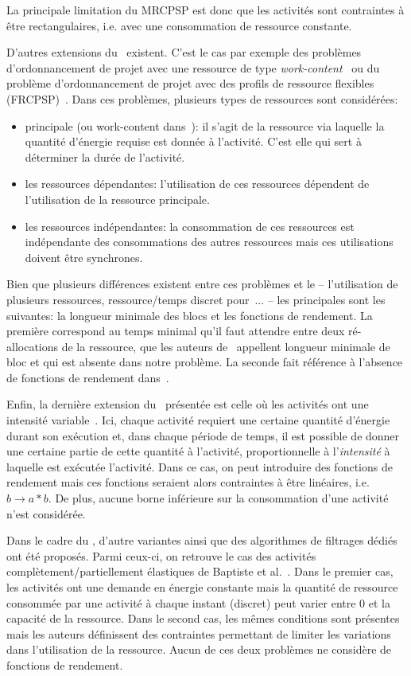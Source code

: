 La principale limitation du MRCPSP est donc que les activités sont
contraintes à être rectangulaires, i.e. avec une consommation de ressource
constante. 

D'autres extensions du \RCPSP~existent. C'est le cas par exemple des
problèmes d'ordonnancement de projet avec une ressource de type {\it
  work-content}~\cite{FT} ou du problème d'ordonnancement de projet
avec des profils de ressource flexibles (FRCPSP)~\cite{NK}. Dans ces
problèmes, plusieurs types de ressources sont considérées: 
\begin{itemize}
\item principale (ou work-content dans~\cite{FT}): il s'agit de la
  ressource via laquelle la quantité d'énergie requise est donnée à
  l'activité. C'est elle qui sert à déterminer la durée de l'activité.
\item les ressources dépendantes: l'utilisation de ces ressources
  dépendent de l'utilisation de la ressource principale.
\item les ressources indépendantes: la consommation de ces ressources
  est indépendante des consommations des autres ressources mais ces
  utilisations doivent être synchrones. 
\end{itemize}

Bien que plusieurs différences existent entre ces problèmes et le
\CECSP -- l'utilisation de plusieurs ressources, ressource/temps discret
pour~\cite{FT}... -- les principales sont les suivantes: la longueur
minimale des blocs et les fonctions de rendement. La première
correspond au temps minimal qu'il faut attendre entre deux
ré-allocations de la ressource, que les auteurs de~\cite{FT} appellent
longueur minimale de bloc et qui est absente dans notre problème. La
seconde fait référence à l'absence de fonctions de rendement
dans~\cite{FT}. 

Enfin, la dernière extension du \RCPSP~présentée est celle où les
activités ont une intensité variable~\cite{Kis}. Ici, chaque activité
requiert une certaine quantité d'énergie durant son exécution et, dans
chaque période de temps, il est possible de donner une certaine partie
de cette quantité à l'activité, proportionnelle à l'{\it intensité} à
laquelle est exécutée l'activité. Dans ce cas, on peut introduire des
fonctions de rendement mais ces fonctions seraient alors contraintes à
être linéaires, i.e. $b \rightarrow a*b$. De plus, aucune borne
inférieure sur la consommation d'une activité n'est considérée. 

Dans le cadre du \CUSP, d'autre variantes ainsi que des algorithmes de
filtrages dédiés ont été proposés. Parmi ceux-ci, on retrouve le cas
des activités complètement/partiellement élastiques de Baptiste et
al.~\cite{BLN}. Dans le premier cas, les activités ont une demande en
énergie constante mais la quantité de ressource consommée par
une activité à chaque instant (discret) peut varier entre $0$ et la
capacité de la ressource. Dans le second cas, les mêmes conditions
sont présentes mais les auteurs définissent des contraintes permettant
de limiter les variations dans l'utilisation de la ressource. Aucun de
ces deux problèmes ne considère de fonctions de rendement. 

